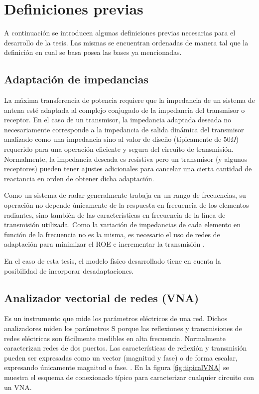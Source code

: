 \section{Definiciones previas} \label{sc:definitions}

A continuación se introducen algunas definiciones previas necesarias para el desarrollo de la tesis. Las mismas se encuentran
ordenadas de manera tal que la definición en cual se basa posea las bases ya mencionadas.


\subsection{Adaptación de impedancias}
La máxima transferencia de potencia requiere que la impedancia de un sistema de antena esté adaptada al complejo conjugado de la
impedancia del transmisor o receptor. En el caso de un transmisor, la impedancia adaptada deseada no necesariamente corresponde a
la impedancia de salida dinámica del transmisor analizado como una impedancia sino al valor de diseño (típicamente de
$50 \Omega$) requerido para una operación eficiente y segura del circuito de transmisión. Normalmente, la impedancia deseada es
resistiva pero un transmisor (y algunos receptores) pueden tener ajustes adicionales para cancelar una cierta cantidad de
reactancia en orden de obtener dicha adaptación.

Como un sistema de radar generalmente trabaja en un rango de frecuencias, su operación no depende únicamente de la respuesta en
frecuencia de los elementos radiantes, sino también de las características en frecuencia de la línea de transmisión utilizada.
Como la variación de impedancias de cada elemento en función de la frecuencia no es la misma, es necesario el uso de redes de
adaptación para minimizar el ROE e incrementar la transmisión \cite{Balanis2012}.

En el caso de esta tesis, el modelo físico desarrollado tiene en cuenta la posibilidad de incorporar desadaptaciones.


\subsection{Analizador vectorial de redes (VNA)}

Es un instrumento que mide los parámetros eléctricos de una red. Dichos analizadores miden los parámetros S porque las
reflexiones y transmisiones de redes eléctricas son fácilmente medibles en alta frecuencia. Normalmente caracterizan redes de
dos puertos. Las características de reflexión y transmisión pueden ser expresadas como un vector (magnitud y fase) o de forma
escalar, expresando únicamente magnitud o fase. \cite{AgilentTechnologies2012}. En la figura \ref{fig:tipicalVNA} se muestra el
esquema de conexionado típico para caracterizar cualquier circuito con un VNA.

